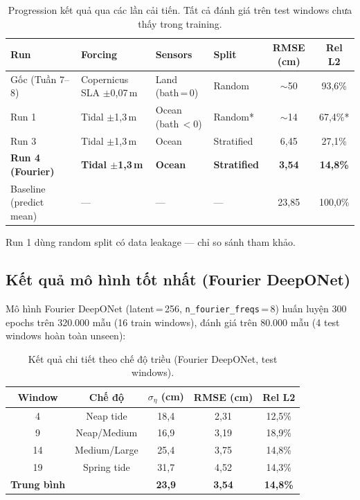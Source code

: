 \documentclass[12pt,a4paper]{article}
\begin{document}
\begin{table}[ht]
  \centering
  \caption{Progression kết quả qua các lần cải tiến. Tất cả đánh giá trên test windows chưa thấy trong training.}
  \label{tab:progression}
  \begin{tabular}{@{}llllcc@{}}
    \toprule
    \textbf{Run} & \textbf{Forcing} & \textbf{Sensors} & \textbf{Split} & \textbf{RMSE (cm)} & \textbf{Rel L2} \\
    \midrule
    Gốc (Tuần 7--8) & Copernicus SLA $\pm$0,07\,m & Land (bath\,=\,0) & Random & $\sim$50 & 93,6\% \\
    Run 1 & Tidal $\pm$1,3\,m & Ocean (bath\,$<0$) & Random* & $\sim$14 & 67,4\%* \\
    Run 3 & Tidal $\pm$1,3\,m & Ocean & Stratified & 6,45 & 27,1\% \\
    \textbf{Run 4 (Fourier)} & \textbf{Tidal $\pm$1,3\,m} & \textbf{Ocean} & \textbf{Stratified} & \textbf{3,54} & \textbf{14,8\%} \\
    \midrule
    Baseline (predict mean) & --- & --- & --- & 23,85 & 100,0\% \\
    \bottomrule
  \end{tabular}
  \begin{flushleft}
    \small *Run 1 dùng random split có data leakage --- chỉ so sánh tham khảo.
  \end{flushleft}
\end{table}

\subsection{Kết quả mô hình tốt nhất (Fourier DeepONet)}

Mô hình Fourier DeepONet (latent\,=\,256, \texttt{n\_fourier\_freqs}\,=\,8) huấn luyện 300 epochs trên 320.000 mẫu (16 train windows), đánh giá trên 80.000 mẫu (4 test windows hoàn toàn unseen):

\begin{table}[ht]
  \centering
  \caption{Kết quả chi tiết theo chế độ triều (Fourier DeepONet, test windows).}
  \label{tab:per_window}
  \begin{tabular}{@{}ccccc@{}}
    \toprule
    \textbf{Window} & \textbf{Chế độ} & \textbf{$\sigma_\eta$ (cm)} & \textbf{RMSE (cm)} & \textbf{Rel L2} \\
    \midrule
    4  & Neap tide    & 18,4 & 2,31 & 12,5\% \\
    9  & Neap/Medium  & 16,9 & 3,19 & 18,9\% \\
    14 & Medium/Large & 25,4 & 3,75 & 14,8\% \\
    19 & Spring tide  & 31,7 & 4,52 & 14,3\% \\
    \midrule
    \textbf{Trung bình} & & \textbf{23,9} & \textbf{3,54} & \textbf{14,8\%} \\
    \bottomrule
  \end{tabular}
\end{table}
\end{document}
